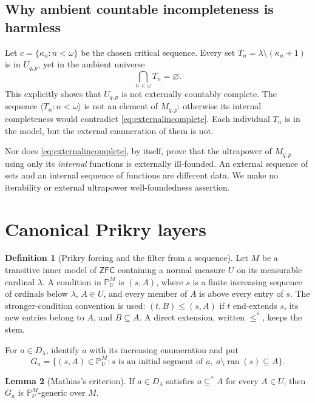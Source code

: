 \documentclass[11pt,letterpaper]{article}
\theoremstyle{definition}
\newtheorem{definition}{Definition}[section]
\newtheorem{lemma}[definition]{Lemma}
\numberwithin{equation}{section}
\newcommand{\ZFC}{\mathsf{ZFC}}
\newcommand{\ran}{\operatorname{ran}}
\newcommand{\PP}{\mathbb P}
\begin{document}
\subsection{Why ambient countable incompleteness is harmless}

Let $c=\{\kappa_n:n<\omega\}$ be the chosen critical sequence.
Every set $T_n=\lambda\setminus(\kappa_n+1)$ is in $U_{q,p}$,
yet in the ambient universe
\begin{equation}\label{eq:externalincomplete}
 \bigcap_{n<\omega}T_n=\varnothing.
\end{equation}
This explicitly shows that $U_{q,p}$ is not externally countably
complete. The sequence $\langle T_n:n<\omega\rangle$ is not an element
of $M_{q,p}$: otherwise its internal completeness would contradict
\eqref{eq:externalincomplete}. Each individual $T_n$ is in the model,
but the external enumeration of them is not.

Nor does \eqref{eq:externalincomplete}, by itself, prove that the
ultrapower of $M_{q,p}$ using only its \emph{internal} functions is
externally ill-founded. An external sequence of sets and an internal
sequence of functions are different data. We make no iterability or
external ultrapower well-foundedness assertion.

\section{Canonical Prikry layers}\label{sec:layers}

\begin{definition}[Prikry forcing and the filter from a sequence]
Let $M$ be a transitive inner model of $\ZFC$ containing a normal measure
$U$ on its measurable cardinal $\lambda$. A condition in $\PP_U^M$ is
$(s,A)$, where $s$ is a finite increasing sequence of ordinals below
$\lambda$, $A\in U$, and every member of $A$ is above every entry of $s$.
The stronger-condition convention is used:
$(t,B)\le(s,A)$ if $t$ end-extends $s$, its new entries belong to $A$,
and $B\subseteq A$. A direct extension, written $\le^*$, keeps the stem.

For $a\in D_\lambda$, identify $a$ with its increasing enumeration and
put
\[
 G_a=\{(s,A)\in\PP_U^M:s\text{ is an initial segment of }a,
              \ a\setminus\ran(s)\subseteq A\}.
\]
\end{definition}

\begin{lemma}[Mathias's criterion]\label{lem:mathias}
If $a\in D_\lambda$ satisfies $a\subseteq^* A$ for every $A\in U$, then
$G_a$ is $\PP_U^M$-generic over $M$.
\end{lemma}
\end{document}
